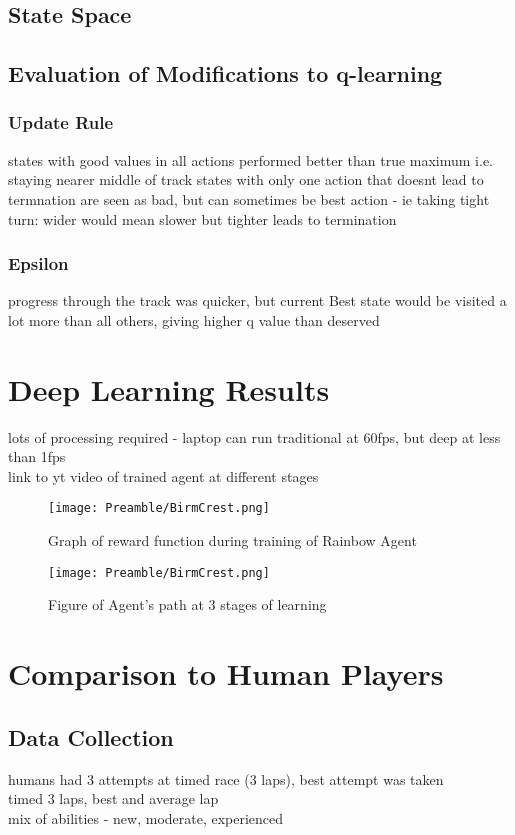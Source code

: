 \subsection{State Space}

\subsection{Evaluation of Modifications to q-learning}
\subsubsection{Update Rule}
states with good values in all actions performed better than true maximum i.e. staying nearer middle of track
states with only one action that doesnt lead to termnation are seen as bad, but can sometimes be best action - ie taking tight turn: wider would mean slower but tighter leads to termination

\subsubsection{Epsilon}
progress through the track was quicker, but current Best state would be visited a lot more than all others, giving higher q value than deserved

\section{Deep Learning Results}
lots of processing required - laptop can run traditional at 60fps, but deep at less than 1fps\\
link to yt video of trained agent at different stages
\begin{figure}[hb]
    \centering
    \texttt{[image: Preamble/BirmCrest.png]}
    \caption{Graph of reward function during training of Rainbow Agent}
    \label{fig:trainig-reward-deep}
\end{figure}

\begin{figure}[hb]
    \centering
    \texttt{[image: Preamble/BirmCrest.png]}
    \caption{Figure of Agent's path at 3 stages of learning}
    \label{fig:agent-path-q}
\end{figure}

\section{Comparison to Human Players}
\subsection{Data Collection}
humans had 3 attempts at timed race (3 laps), best attempt was taken\\ timed 3 laps, best and average lap
\\ mix of abilities - new, moderate, experienced

